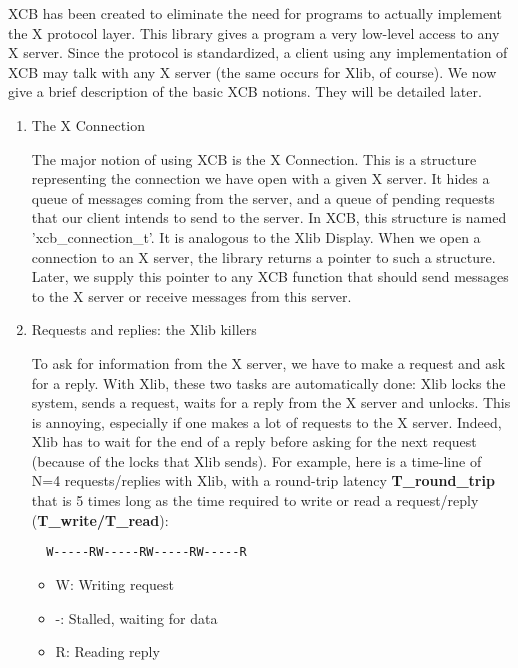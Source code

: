 \documentclass[12pt,oneside,titlepage]{book}
\providecommand{\tightlist}{%
  \setlength{\itemsep}{0pt}\setlength{\parskip}{0pt}}
\begin{document}
\begin{enumerate}
  XCB has been created to eliminate the need for programs to actually
  implement the X protocol layer. This library gives a program a very
  low-level access to any X server. Since the protocol is standardized,
  a client using any implementation of XCB may talk with any X server
  (the same occurs for Xlib, of course). We now give a brief description
  of the basic XCB notions. They will be detailed later.

  \begin{enumerate}
  \item
    \protect\hypertarget{conn}{}{The X Connection}

    The major notion of using XCB is the X Connection. This is a
    structure representing the connection we have open with a given X
    server. It hides a queue of messages coming from the server, and a
    queue of pending requests that our client intends to send to the
    server. In XCB, this structure is named 'xcb\_connection\_t'. It is
    analogous to the Xlib Display. When we open a connection to an X
    server, the library returns a pointer to such a structure. Later, we
    supply this pointer to any XCB function that should send messages to
    the X server or receive messages from this server.
  \item
    \protect\hypertarget{requestsreplies}{}{Requests and replies: the
    Xlib killers}

    To ask for information from the X server, we have to make a request
    and ask for a reply. With Xlib, these two tasks are automatically
    done: Xlib locks the system, sends a request, waits for a reply from
    the X server and unlocks. This is annoying, especially if one makes
    a lot of requests to the X server. Indeed, Xlib has to wait for the
    end of a reply before asking for the next request (because of the
    locks that Xlib sends). For example, here is a time-line of N=4
    requests/replies with Xlib, with a round-trip latency
    \textbf{T\_round\_trip} that is 5 times long as the time required to
    write or read a request/reply (\textbf{T\_write/T\_read}):

\begin{verbatim}
  W-----RW-----RW-----RW-----R
\end{verbatim}

    \begin{itemize}
    \tightlist
    \item
      W: Writing request
    \item
      -: Stalled, waiting for data
    \item
      R: Reading reply
    \end{itemize}


\end{enumerate}
\end{enumerate}
\end{document}
